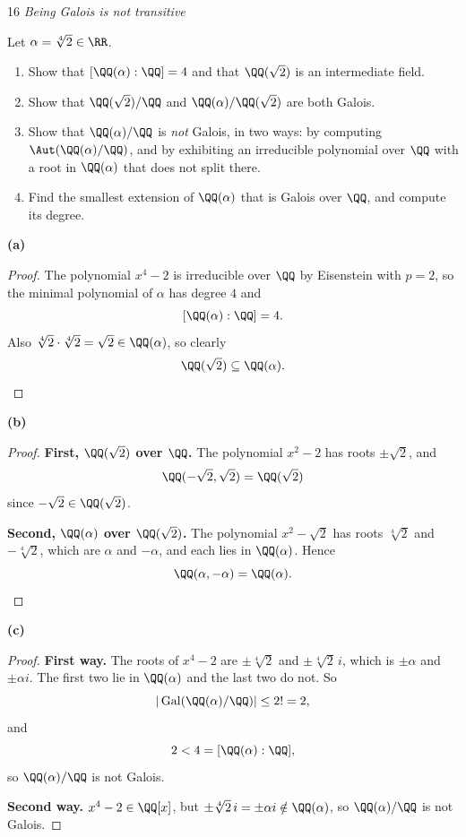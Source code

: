 \documentclass[11pt]{article}
\begin{document}
\begin{problem}{16}
  \textit{Being Galois is not transitive}\par
  Let $\alpha=\sqrt[4]{2}\in\RR$.
  \begin{enumerate}[label=(\alph*)]
    \item Show that $[\QQ(\alpha):\QQ]=4$ and that $\QQ(\sqrt2)$ is an intermediate field.
    \item Show that $\QQ(\sqrt2)/\QQ$ and $\QQ(\alpha)/\QQ(\sqrt2)$ are both Galois.
    \item Show that $\QQ(\alpha)/\QQ$ is \emph{not} Galois, in two ways: by computing $\Aut(\QQ(\alpha)/\QQ)$, and by exhibiting an irreducible polynomial over $\QQ$ with a root in $\QQ(\alpha)$ that does not split there.
    \item Find the smallest extension of $\QQ(\alpha)$ that is Galois over $\QQ$, and compute its degree.
  \end{enumerate}
\end{problem}
\noindent\textbf{(a)}
\begin{proof}
The polynomial $x^{4}-2$ is irreducible over $\QQ$ by Eisenstein with $p=2$, so the minimal polynomial of $\alpha$ has degree $4$ and
\[
[\QQ(\alpha):\QQ]=4.
\]
Also $\sqrt[4]{2}\cdot\sqrt[4]{2}=\sqrt2\in\QQ(\alpha)$, so clearly
\[
\QQ(\sqrt2)\subseteq\QQ(\alpha).
\]
\end{proof}
\noindent\textbf{(b)}
\begin{proof}
\textbf{First, $\QQ(\sqrt2)$ over $\QQ$.} The polynomial $x^{2}-2$ has roots $\pm\sqrt2$, and
\[
\QQ(-\sqrt2,\sqrt2)=\QQ(\sqrt2)
\]
since $-\sqrt2\in\QQ(\sqrt2)$.

\textbf{Second, $\QQ(\alpha)$ over $\QQ(\sqrt2)$.} The polynomial $x^{2}-\sqrt2$ has roots $\sqrt[4]{2}$ and $-\sqrt[4]{2}$, which are $\alpha$ and $-\alpha$, and each lies in $\QQ(\alpha)$. Hence
\[
\QQ(\alpha,-\alpha)=\QQ(\alpha).
\]
\end{proof}
\noindent\textbf{(c)}
\begin{proof}
\textbf{First way.} The roots of $x^{4}-2$ are $\pm\sqrt[4]{2}$ and $\pm\sqrt[4]{2}\,i$, which is $\pm\alpha$ and $\pm\alpha i$. The first two lie in $\QQ(\alpha)$ and the last two do not. So
\[
|\operatorname{Gal}(\QQ(\alpha)/\QQ)|\le 2!=2,
\]
and
\[
2<4=[\QQ(\alpha):\QQ],
\]
so $\QQ(\alpha)/\QQ$ is not Galois.

\textbf{Second way.} $x^{4}-2\in\QQ[x]$, but $\pm\sqrt[4]{2}\,i=\pm\alpha i\notin\QQ(\alpha)$, so $\QQ(\alpha)/\QQ$ is not Galois.
\end{proof}
\end{document}
